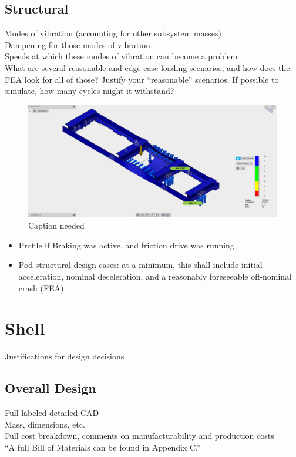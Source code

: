 \documentclass{report}
\begin{document}
    \subsection{Structural}
    Modes of vibration (accounting for other subsystem masses)\\
    Dampening for those modes of vibration\\
    Speeds at which these modes of vibration can become a problem\\
    What are several reasonable and edge-case loading scenarios, and how does the FEA look for all of those? Justify your “reasonable” scenarios. If possible to simulate, how many cycles might it withstand?
    \begin{figure}[H]
        \centering
        \includegraphics[width=\linewidth]{images/fig25}
        \caption{Caption needed}
    \end{figure}
    \begin{itemize}
        \item Profile if Braking was active, and friction drive was running
        \item Pod structural design cases: at a minimum, this shall include initial acceleration, nominal deceleration, and a reasonably foreseeable off-nominal crash (FEA)
    \end{itemize}
    
    \section{Shell}
    Justifications for design decisions
    \subsection{Overall Design}
    Full labeled detailed CAD\\
    Mass, dimensions, etc.\\
    Full cost breakdown, comments on manufacturability and production costs\\
    “A full Bill of Materials can be found in Appendix C.”
    
\end{document}
